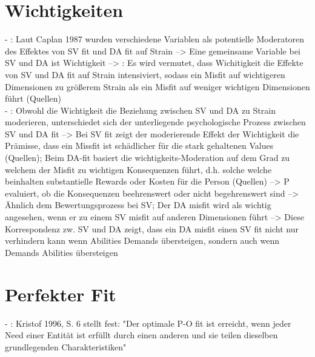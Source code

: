 \section{Wichtigkeiten}
\label{ch:personEnvironmentFit:wichtigkeiten}
- \cite[S. 9]{edwards:1996}: Laut Caplan 1987 wurden verschiedene Variablen als potentielle Moderatoren des Effektes von SV fit und DA fit auf Strain --> Eine gemeinsame Variable bei SV und DA ist Wichtigkeit --> \cite[S. 10]{edwards:1996}: Es wird vermutet, dass Wichitigkeit die Effekte von SV und DA fit auf Strain intensiviert, sodass ein Misfit auf wichtigeren Dimensionen zu größerem Strain als ein Misfit auf weniger wichtigen Dimensionen führt (Quellen)\\
- \cite[S. 10]{edwards:1996}: Obwohl die Wichtigkeit die Beziehung zwischen SV und DA zu Strain moderieren, unterschiedet sich der unterliegende psychologische Prozess zwischen SV und DA fit --> Bei SV fit zeigt der moderierende Effekt der Wichtigkeit die Prämisse, dass ein Missfit ist schädlicher für die stark gehaltenen Values (Quellen); Beim DA-fit basiert die wichtigkeits-Moderation auf dem Grad zu welchem der Misfit zu wichtigen Konsequenzen führt, d.h. solche welche beinhalten substantielle Rewards oder Kosten für die Person (Quellen) --> P evaluiert, ob die Konsequenzen beehrenswert oder nicht begehrenswert sind --> Ähnlich dem Bewertungsprozess bei SV; Der DA misfit wird als wichtig angesehen, wenn er zu einem SV misfit auf anderen Dimensionen führt --> Diese Korrespondenz zw. SV und DA zeigt, dass ein DA misfit einen SV fit nicht nur verhindern kann wenn Abilities Demands übersteigen, sondern auch wenn Demands Abilities übersteigen \\


\section{Perfekter Fit}
\label{ch:personEnvironmentFit:perfekterFit}
- \cite[S. 4]{edwards:2004}: Kristof 1996, S. 6 stellt fest: "Der optimale P-O fit ist erreicht, wenn jeder Need einer Entität ist erfüllt durch einen anderen und sie teilen dieselben grundlegenden Charakteristiken" \\



